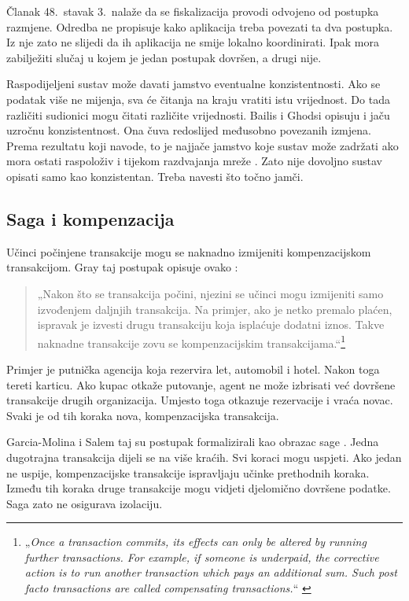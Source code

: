 Članak 48.\ stavak 3.\ nalaže da se fiskalizacija provodi odvojeno od
postupka razmjene. Odredba ne propisuje kako aplikacija treba povezati ta dva
postupka. Iz nje zato ne slijedi da ih aplikacija ne smije lokalno
koordinirati. Ipak mora zabilježiti slučaj u kojem je jedan postupak dovršen,
a drugi nije.

Raspodijeljeni sustav može davati jamstvo eventualne konzistentnosti. Ako se
podatak više ne mijenja, sva će čitanja na kraju vratiti istu vrijednost. Do
tada različiti sudionici mogu čitati različite vrijednosti. Bailis i Ghodsi
opisuju i jaču uzročnu konzistentnost. Ona čuva redoslijed međusobno povezanih
izmjena. Prema rezultatu koji navode, to je najjače jamstvo koje sustav može
zadržati ako mora ostati raspoloživ i tijekom razdvajanja mreže
\cite{bailis2013eventual}. Zato nije dovoljno sustav opisati samo kao
konzistentan. Treba navesti što točno jamči.

\subsection{Saga i kompenzacija}
\label{sec:saga}

Učinci počinjene transakcije mogu se naknadno izmijeniti kompenzacijskom
transakcijom. Gray taj postupak opisuje ovako \cite{gray1981transaction}:

\begin{quote}
„Nakon što se transakcija počini, njezini se učinci mogu izmijeniti samo
izvođenjem daljnjih transakcija. Na primjer, ako je netko premalo plaćen,
ispravak je izvesti drugu transakciju koja isplaćuje dodatni iznos. Takve
naknadne transakcije zovu se kompenzacijskim
transakcijama.“\footnote{„\emph{Once a transaction commits, its effects can
only be altered by running further transactions. For example, if someone is
underpaid, the corrective action is to run another transaction which pays an
additional sum. Such post facto transactions are called compensating
transactions.}“ \cite{gray1981transaction}} \end{quote}

Primjer je putnička agencija koja rezervira let, automobil i hotel. Nakon toga
tereti karticu. Ako kupac otkaže putovanje, agent ne može izbrisati već
dovršene transakcije drugih organizacija. Umjesto toga otkazuje rezervacije i
vraća novac. Svaki je od tih koraka nova, kompenzacijska transakcija.

Garcia-Molina i Salem taj su postupak formalizirali kao obrazac sage
\cite{garciamolina1987sagas}. Jedna dugotrajna transakcija dijeli se na više
kraćih. Svi koraci mogu uspjeti. Ako jedan ne uspije, kompenzacijske
transakcije ispravljaju učinke prethodnih koraka. Između tih koraka druge
transakcije mogu vidjeti djelomično dovršene podatke. Saga zato ne osigurava
izolaciju.

